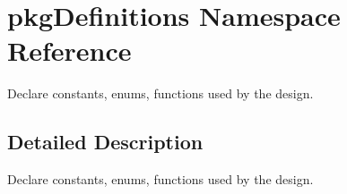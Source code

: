 \section{pkg\-Definitions Namespace Reference}
\label{namespacepkg_definitions}


Declare constants, enums, functions used by the design.  




\subsection{Detailed Description}
Declare constants, enums, functions used by the design. 